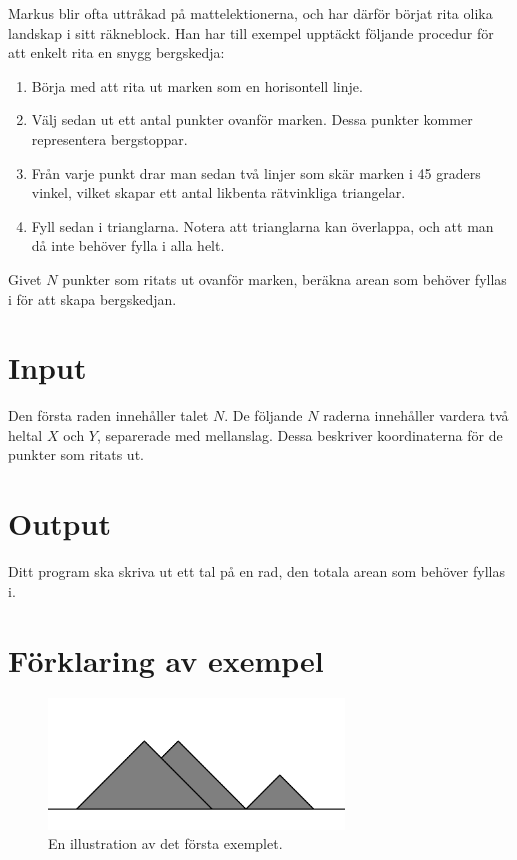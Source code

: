 Markus blir ofta uttråkad på mattelektionerna, och har därför börjat rita olika landskap i sitt räkneblock. Han har till exempel upptäckt följande procedur för att enkelt rita en snygg bergskedja:

\begin{enumerate}
\item Börja med att rita ut marken som en horisontell linje.
\item Välj sedan ut ett antal punkter ovanför marken. Dessa punkter kommer representera bergstoppar.
\item Från varje punkt drar man sedan två linjer som skär marken i 45 graders vinkel, vilket skapar ett antal likbenta rätvinkliga triangelar.
\item Fyll sedan i trianglarna. Notera att trianglarna kan överlappa, och att man då inte behöver fylla i alla helt.
\end{enumerate}

\noindent Givet $N$ punkter som ritats ut ovanför marken, beräkna arean som behöver fyllas i för att skapa bergskedjan.

\section*{Input}
Den första raden innehåller talet $N$. De följande $N$ raderna innehåller vardera två heltal $X$ och $Y$, separerade med mellanslag. Dessa beskriver koordinaterna för de punkter som ritats ut.

\section*{Output}
Ditt program ska skriva ut ett tal på en rad, den totala arean som behöver fyllas i.

\section*{Förklaring av exempel}

\begin{figure}[ht!]
\centering
\includegraphics[width=0.7\textwidth]{bergskedja.png}
\caption{En illustration av det första exemplet.}
\label{overflow}
\end{figure}

